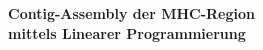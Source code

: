 
\vspace*{4cm}
\begin{center}
\begin{Huge}
\bf Contig-Assembly der MHC-Region  \\ mittels Linearer Programmierung\\ \vspace*{1cm}
\end{Huge}
\end{center}
\thispagestyle{empty}